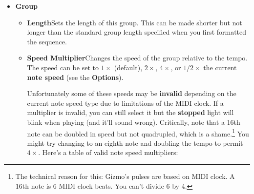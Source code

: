\documentclass{article}
\begin{document}
\begin{itemize}
\enlargethispage{1em}


\item {\bf Group} 

\begin{itemize}
\item {\bf Length}\quad Sets the length of this group.  This can be made shorter but not longer than the standard group length specified when you first formatted the sequence. 
\item {\bf Speed Multiplier}\quad Changes the speed of the group relative to the tempo.   The speed can be set to \(1\times\) (default), \(2\times\), \(4\times\), or \(1/2\times\) the current  {\bf note speed} (see the {\bf Options}).  

Unfortunately some of these speeds may be {\bf invalid} depending on the current note speed type due to limitations of the MIDI clock.  If a multiplier is invalid, you can still select it but the {\bf stopped} light will blink when playing (and it'll sound wrong). Critically, note that a 16th note can be doubled in speed but not quadrupled, which is a shame.\footnote{The technical reason for this: Gizmo's pulses are based on MIDI clock.  A 16th note is 6 MIDI clock beats.  You can't divide 6 by 4. }  You might try changing to an eighth note and doubling the tempo to permit \(4\times\). Here's a table of valid note speed multipliers:


\end{itemize}
\end{itemize}
\end{document}
